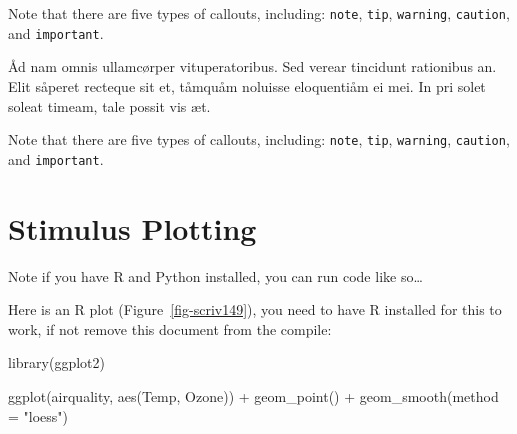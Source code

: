 \documentclass[
  12pt,
  a4paper,
  numbers=noenddot,
  titlepage,
  toclink=all,
  toc=bibliography]{scrbook}
\newenvironment{Shaded}{\begin{snugshade}}{\end{snugshade}}
\newcommand{\AttributeTok}[1]{\textcolor[rgb]{0.40,0.45,0.13}{#1}}
\newcommand{\FunctionTok}[1]{\textcolor[rgb]{0.28,0.35,0.67}{#1}}
\newcommand{\NormalTok}[1]{\textcolor[rgb]{0.00,0.23,0.31}{#1}}
\newcommand{\SpecialCharTok}[1]{\textcolor[rgb]{0.37,0.37,0.37}{#1}}
\newcommand{\StringTok}[1]{\textcolor[rgb]{0.13,0.47,0.30}{#1}}
\theoremstyle{plain}
\theoremstyle{definition}
\theoremstyle{definition}
\theoremstyle{definition}
\theoremstyle{plain}
\theoremstyle{plain}
\theoremstyle{plain}
\theoremstyle{plain}
\theoremstyle{remark}
\begin{document}
\begin{tcolorbox}[enhanced jigsaw, colbacktitle=quarto-callout-important-color!10!white, leftrule=.75mm, breakable, bottomrule=.15mm, coltitle=black, colback=white, rightrule=.15mm, left=2mm, opacitybacktitle=0.6, opacityback=0, toptitle=1mm, titlerule=0mm, title=\textcolor{quarto-callout-important-color}{\faExclamation}\hspace{0.5em}{Important}, arc=.35mm, colframe=quarto-callout-important-color-frame, toprule=.15mm, bottomtitle=1mm]

Note that there are five types of callouts, including: \texttt{note},
\texttt{tip}, \texttt{warning}, \texttt{caution}, and
\texttt{important}.

\end{tcolorbox}

Åd nam omnis ullamcørper vituperatoribus. Sed verear tincidunt
rationibus an. Elit såperet recteque sit et, tåmquåm noluisse
eloquentiåm ei mei. In pri solet soleat timeam, tale possit vis æt.

\begin{tcolorbox}[enhanced jigsaw, colbacktitle=quarto-callout-note-color!10!white, leftrule=.75mm, breakable, bottomrule=.15mm, coltitle=black, colback=white, rightrule=.15mm, left=2mm, opacitybacktitle=0.6, opacityback=0, toptitle=1mm, titlerule=0mm, title=\textcolor{quarto-callout-note-color}{\faInfo}\hspace{0.5em}{Note}, arc=.35mm, colframe=quarto-callout-note-color-frame, toprule=.15mm, bottomtitle=1mm]

Note that there are five types of callouts, including: \texttt{note},
\texttt{tip}, \texttt{warning}, \texttt{caution}, and
\texttt{important}.

\end{tcolorbox}

\hypertarget{sec-scriv149}{%
\section{Stimulus Plotting}\label{sec-scriv149}}

\protect\hypertarget{scriv149}{}{}

Note if you have R and Python installed, you can run code like
so\ldots{}

Here is an R plot
(\protect\hypertarget{cite_18}{}{\label{cite_18}Figure~\ref{fig-scriv149}}),
you need to have R installed for this to work, if not remove this
document from the compile:

\begin{Shaded}
\begin{Highlighting}[numbers=left,,]
\FunctionTok{library}\NormalTok{(ggplot2)}

\FunctionTok{ggplot}\NormalTok{(airquality, }\FunctionTok{aes}\NormalTok{(Temp, Ozone)) }\SpecialCharTok{+} 
  \FunctionTok{geom\_point}\NormalTok{() }\SpecialCharTok{+} 
  \FunctionTok{geom\_smooth}\NormalTok{(}\AttributeTok{method =} \StringTok{"loess"}\NormalTok{)}
\end{Highlighting}
\end{Shaded}
\end{document}
